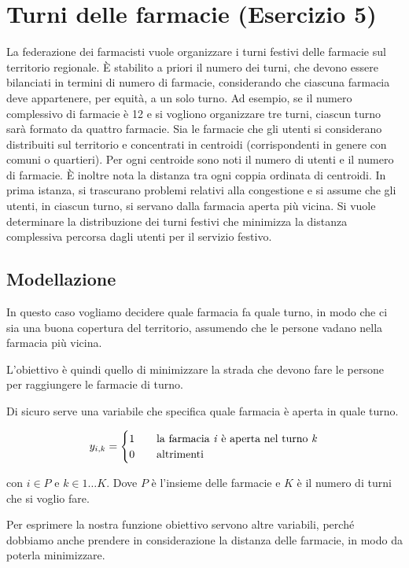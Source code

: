 \section{Turni delle farmacie (Esercizio 5)}

La federazione dei farmacisti vuole organizzare i turni festivi delle farmacie sul territorio regionale. 
\`E stabilito a priori il numero dei turni, che devono essere bilanciati in termini di numero di farmacie, considerando che ciascuna farmacia deve appartenere, per equità, a un solo turno. 
Ad esempio, se il numero complessivo di farmacie è 12 e si vogliono organizzare tre turni, ciascun turno sarà formato da quattro farmacie. 
Sia le farmacie che gli utenti si considerano distribuiti sul territorio e concentrati in centroidi (corrispondenti in genere con comuni o quartieri). 
Per ogni centroide sono noti il numero di utenti e il numero di farmacie. \`E inoltre nota la distanza tra ogni coppia ordinata di centroidi. 
In prima istanza, si trascurano problemi relativi alla congestione e si assume che gli utenti, in ciascun turno, si servano dalla farmacia aperta più vicina. 
Si vuole determinare la distribuzione dei turni festivi che minimizza la distanza complessiva percorsa dagli utenti per il servizio festivo.

\subsection{Modellazione}

In questo caso vogliamo decidere quale farmacia fa quale turno, in modo che ci sia una buona copertura del territorio, assumendo che le persone vadano nella farmacia più vicina.

L'obiettivo è quindi quello di minimizzare la strada che devono fare le persone per raggiungere le farmacie di turno.

Di sicuro serve una variabile che specifica quale farmacia è aperta in quale turno.

$$
y_{i,k} = \begin{cases}
1 \quad &\text{la farmacia \textit{i} è aperta nel turno \textit{k}} \\
0 \quad &\text{altrimenti}
\end{cases}
$$

\noindent con $i \in P$ e $k \in 1 \ldots K$. Dove $P$ è l'insieme delle farmacie e $K$ è il numero di turni che si voglio fare.

Per esprimere la nostra funzione obiettivo servono altre variabili, perché dobbiamo anche prendere in considerazione la distanza delle farmacie, in modo da poterla minimizzare.

